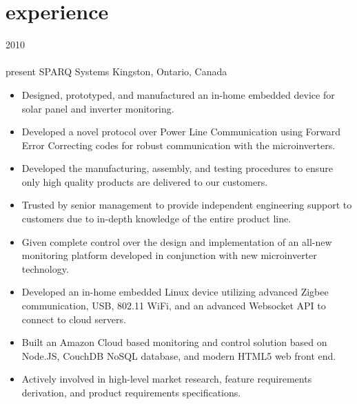 
\section{experience}

\begin{entrylist}
\entry
  {2010\\\faChevronDown\\{\bodyfontit present}}
  {SPARQ Systems}
  {Kingston, Ontario, Canada}
  {
\begin{itemize}[leftmargin=12pt]
	\item Designed, prototyped, and manufactured an in-home {\bodyfontit embedded device} for solar panel and inverter monitoring.
	\item Developed a novel protocol over Power Line Communication using Forward Error Correcting codes for robust communication with the microinverters.
	\item Developed the manufacturing, assembly, and testing procedures to ensure only high quality products are delivered to our customers.
	\item Trusted by senior management to provide independent engineering support to customers due to in-depth knowledge of the entire product line.
\end{itemize}
\begin{itemize}[leftmargin=12pt]
	\item Given complete control over the design and implementation of an all-new monitoring platform developed in conjunction with new microinverter technology.
  \item Developed an in-home embedded {\bodyfontit Linux} device utilizing advanced {\bodyfontit Zigbee} communication, USB, 802.11 {\bodyfontit WiFi}, and an advanced {\bodyfontit Websocket} API to connect to cloud servers.
  \item Built an Amazon {\bodyfontit Cloud} based monitoring and control solution based on {\bodyfontit Node.JS}, {\bodyfontit CouchDB} NoSQL database, and modern {\bodyfontit HTML5} web front end.
	\item Actively involved in high-level market research, feature requirements derivation, and product requirements specifications.

\end{itemize}}
\end{entrylist}
